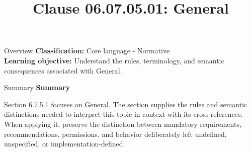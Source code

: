 \documentclass[10pt,letterpaper]{article}
\title{Clause 06.07.05.01: General}
\author{}
\date{}
\begin{document}
\maketitle
\begin{CornellOverviewBox}{Overview}
\textbf{Classification:} Core language - Normative\\[2pt]
\textbf{Learning objective:} Understand the rules, terminology, and semantic consequences associated with General.
\end{CornellOverviewBox}\begin{CornellSummaryBox}{Summary}
{\sffamily\bfseries\color{Accent} Summary}\par\vspace{3pt}Section 6.7.5.1 focuses on General. The section supplies the rules and semantic distinctions needed to interpret this topic in context with its cross-references. When applying it, preserve the distinction between mandatory requirements, recommendations, permissions, and behavior deliberately left undefined, unspecified, or implementation-defined.
\end{CornellSummaryBox}
\end{document}
